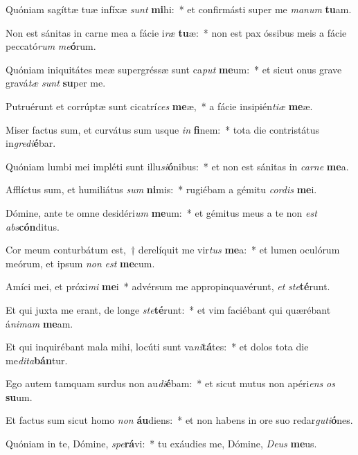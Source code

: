 \item Quóniam sagíttæ tuæ infíxæ \textit{sunt} \textbf{mi}hi:~* et confirmásti super me \textit{ma}\textit{num} \textbf{tu}am.
\item Non est sánitas in carne mea a fácie i\textit{ræ} \textbf{tu}æ:~* non est pax óssibus meis a fácie peccató\textit{rum} \textit{me}\textbf{ó}rum.
\item Quóniam iniquitátes meæ supergréssæ sunt ca\textit{put} \textbf{me}um:~* et sicut onus grave gravá\textit{tæ} \textit{sunt} \textbf{su}per me.
\item Putruérunt et corrúptæ sunt cicatrí\textit{ces} \textbf{me}æ,~* a fácie insipién\textit{ti}\textit{æ} \textbf{me}æ.
\item Miser factus sum, et curvátus sum usque \textit{in} \textbf{fi}nem:~* tota die contristátus in\textit{gre}\textit{di}\textbf{é}bar.
\item Quóniam lumbi mei impléti sunt illu\textit{si}\textbf{ó}nibus:~* et non est sánitas in \textit{car}\textit{ne} \textbf{me}a.
\item Afflíctus sum, et humiliátus \textit{sum} \textbf{ni}mis:~* rugiébam a gémitu \textit{cor}\textit{dis} \textbf{me}i.
\item Dómine, ante te omne desidéri\textit{um} \textbf{me}um:~* et gémitus meus a te non \textit{est} \textit{abs}\textbf{cón}ditus.
\item Cor meum conturbátum est,~† derelíquit me vir\textit{tus} \textbf{me}a:~* et lumen oculórum meórum, et ipsum \textit{non} \textit{est} \textbf{me}cum.
\item Amíci mei, et próxi\textit{mi} \textbf{me}i~* advérsum me appropinquavérunt, \textit{et} \textit{ste}\textbf{té}runt.
\item Et qui juxta me erant, de longe \textit{ste}\textbf{té}runt:~* et vim faciébant qui quærébant á\textit{ni}\textit{mam} \textbf{me}am.
\item Et qui inquirébant mala mihi, locúti sunt va\textit{ni}\textbf{tá}tes:~* et dolos tota die me\textit{di}\textit{ta}\textbf{bán}tur.
\item Ego autem tamquam surdus non au\textit{di}\textbf{é}bam:~* et sicut mutus non apéri\textit{ens} \textit{os} \textbf{su}um.
\item Et factus sum sicut homo \textit{non} \textbf{áu}diens:~* et non habens in ore suo redar\textit{gu}\textit{ti}\textbf{ó}nes.
\item Quóniam in te, Dómine, \textit{spe}\textbf{rá}vi:~* tu exáudies me, Dómine, \textit{De}\textit{us} \textbf{me}us.
